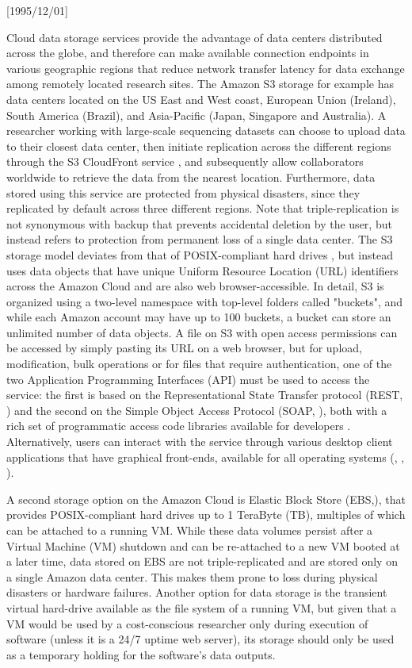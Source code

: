 \NeedsTeXFormat{LaTeX2e}[1995/12/01] \documentclass[10pt]{bmc_article}
\newenvironment{bmcformat}{\begin{raggedright}\baselineskip20pt\sloppy\setboolean{publ}{false}}{\end{raggedright}\baselineskip20pt\sloppy}
\begin{document}
\begin{bmcformat}
Cloud data storage services provide the advantage of data centers distributed across the globe, and therefore can make available 
connection endpoints in various geographic regions that reduce network transfer latency for data exchange among remotely 
located research sites. The Amazon S3 storage for example \cite{s3} has data centers located on the US East and West coast, 
European Union (Ireland), South America (Brazil), and Asia-Pacific (Japan, Singapore and Australia). A researcher working with
large-scale sequencing datasets can choose to upload data to their closest data center, then initiate replication across the 
different regions through the S3 CloudFront service \cite{cloudfront}, and subsequently allow collaborators worldwide 
to retrieve the data from the nearest location. Furthermore,  data stored using this service are protected from physical disasters,
since they replicated  by default across three different regions. Note that triple-replication is not synonymous with backup that
prevents accidental deletion by  the user, but instead refers to protection from permanent loss of a single data center.  The S3 
storage model deviates from that of POSIX-compliant hard drives \cite{mathur2007new}, but instead uses data objects that have unique Uniform Resource 
Location (URL)  identifiers across the Amazon Cloud and are also web browser-accessible. In detail, S3 is organized using a two-level 
namespace with top-level folders called "buckets", and while each Amazon account may have up to 100 buckets, a bucket can store 
an unlimited number of data objects. A file on S3 with open access permissions can be accessed by simply pasting its URL on a web 
browser, but for upload, modification, bulk operations or for files that require authentication, one of the two Application Programming 
Interfaces (API) must be used to access the service: the first is based on the Representational State Transfer protocol (REST, 
\cite{fielding2000})  and the second on the Simple  Object Access Protocol (SOAP, \cite{soap}), both with a rich set of programmatic
access code libraries available for developers \cite{s3developer}. Alternatively, users can interact with the service through various 
desktop client applications that have graphical front-ends, available for all operating systems (\cite{cyberduck}, \cite{s3browse}, 
\cite{s3fox}). \pb

A second storage option on the Amazon Cloud is Elastic Block Store (EBS,\cite{ebs}), that provides POSIX-compliant \cite{mathur2007new} 
hard drives up to 1 TeraByte (TB), multiples of which can be attached to a running VM. While these data volumes persist after a Virtual 
Machine (VM) shutdown and can be re-attached to a new VM booted at a later time, data stored on EBS are not triple-replicated and are 
stored only on a single Amazon data center. This makes them prone to loss during physical disasters or hardware failures. Another 
option for data storage is the transient virtual hard-drive available as the file system of a running VM, but given that a VM would be 
used by a cost-conscious researcher only during execution of software (unless it is a 24/7 uptime web server), its storage should 
only be used as a temporary holding for the software's data outputs.  \pb


\end{bmcformat}
\end{document}

